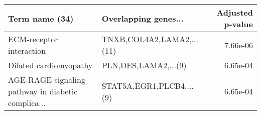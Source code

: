 \begin{tabular}{llr}
\toprule
                                    Term name (34) &      Overlapping genes... &  Adjusted p-value \\
\midrule
                          ECM-receptor interaction & TNXB,COL4A2,LAMA2,...(11) &          7.66e-06 \\
                            Dilated cardiomyopathy &      PLN,DES,LAMA2,...(9) &          6.65e-04 \\
AGE-RAGE signaling pathway in diabetic complica... &  STAT5A,EGR1,PLCB4,...(9) &          6.65e-04 \\
\bottomrule
\end{tabular}
